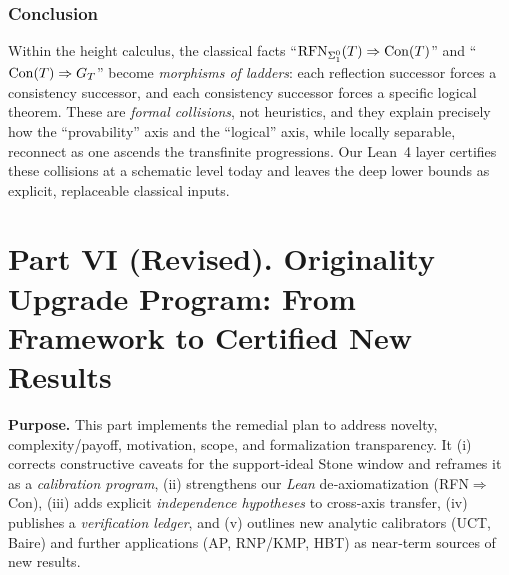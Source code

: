 \documentclass[11pt]{article}
\theoremstyle{definition}
\theoremstyle{remark}
\newcommand{\cnull}{c_0}
\newcommand{\linf}{\ell^\infty}
\newcommand{\WLPO}{\mathrm{WLPO}}
\newcommand{\BISH}{\mathrm{BISH}}
\newcommand{\SigmaZero}{\Sigma_{0}}
\begin{document}
\section{Conclusion}

Within the height calculus, the classical facts “\(\RFNSigOne(T)\Rightarrow \Con(T)\)” and “\(\Con(T)\Rightarrow G_T\)”
become \emph{morphisms of ladders}: each reflection successor forces a consistency successor, and each consistency
successor forces a specific logical theorem. These are \emph{formal collisions}, not heuristics,
and they explain precisely how the “provability” axis and the “logical” axis, while locally separable,
reconnect as one ascends the transfinite progressions. Our Lean~4 layer certifies these collisions
at a schematic level today and leaves the deep lower bounds as explicit, replaceable classical inputs.




\part*{Part VI (Revised). Originality Upgrade Program: From Framework to Certified New Results}

\providecommand{\BISH}{\mathrm{BISH}}
\providecommand{\WLPO}{\mathrm{WLPO}}
\providecommand{\LPO}{\mathrm{LPO}}
\providecommand{\FT}{\mathrm{FT}}
\providecommand{\DCw}{\mathrm{DC}_\omega}
\providecommand{\PA}{\mathrm{PA}}
\providecommand{\HA}{\mathrm{HA}}
\providecommand{\Con}{\mathrm{Con}}
\providecommand{\RFNSigOne}{\mathrm{RFN}_{\Sigma^0_1}}
\providecommand{\SigmaZero}{\Sigma_0}
\providecommand{\linf}{\ell^\infty}
\providecommand{\cnull}{c_0}

\begin{mdframed}[style=status]
\textbf{Purpose.} This part implements the remedial plan to address novelty, complexity/payoff, motivation, scope, and formalization transparency. It (i) corrects constructive caveats for the support‑ideal Stone window and reframes it as a \emph{calibration program}, (ii) strengthens our \emph{Lean} de‑axiomatization (RFN\(\Rightarrow\)Con), (iii) adds explicit \emph{independence hypotheses} to cross‑axis transfer, (iv) publishes a \emph{verification ledger}, and (v) outlines new analytic calibrators (UCT, Baire) and further applications (AP, RNP/KMP, HBT) as near‑term sources of new results.
\end{mdframed}
\end{document}
